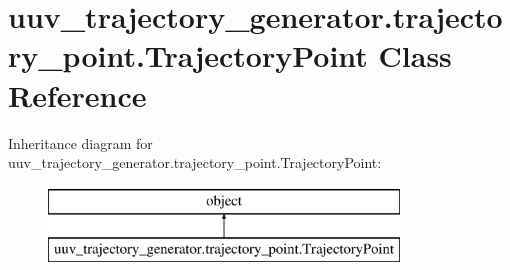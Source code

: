 \hypertarget{classuuv__trajectory__generator_1_1trajectory__point_1_1TrajectoryPoint}{}\section{uuv\+\_\+trajectory\+\_\+generator.\+trajectory\+\_\+point.\+Trajectory\+Point Class Reference}
\label{classuuv__trajectory__generator_1_1trajectory__point_1_1TrajectoryPoint}
Inheritance diagram for uuv\+\_\+trajectory\+\_\+generator.\+trajectory\+\_\+point.\+Trajectory\+Point\+:\begin{figure}[H]
\begin{center}
\leavevmode
\includegraphics[height=2.000000cm]{classuuv__trajectory__generator_1_1trajectory__point_1_1TrajectoryPoint}
\end{center}
\end{figure}
